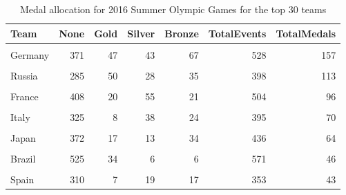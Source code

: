 \documentclass[
]{article}
\begin{document}
\begin{table}[H]
\centering
\caption{\label{tab:SummerBreakDownWinners2}Medal allocation for 2016 Summer Olympic Games for the top 30 teams}
\centering
\fontsize{7}{9}\selectfont
\begin{tabular}[t]{lrrrrrr}
\toprule
Team & None & Gold & Silver & Bronze & TotalEvents & TotalMedals\\
\midrule
\cellcolor{gray!10}{United States} & \cellcolor{gray!10}{443} & \cellcolor{gray!10}{137} & \cellcolor{gray!10}{52} & \cellcolor{gray!10}{67} & \cellcolor{gray!10}{699} & \cellcolor{gray!10}{256}\\
Germany & 371 & 47 & 43 & 67 & 528 & 157\\
\cellcolor{gray!10}{Great Britain} & \cellcolor{gray!10}{325} & \cellcolor{gray!10}{64} & \cellcolor{gray!10}{55} & \cellcolor{gray!10}{26} & \cellcolor{gray!10}{470} & \cellcolor{gray!10}{145}\\
Russia & 285 & 50 & 28 & 35 & 398 & 113\\
\cellcolor{gray!10}{China} & \cellcolor{gray!10}{374} & \cellcolor{gray!10}{44} & \cellcolor{gray!10}{30} & \cellcolor{gray!10}{35} & \cellcolor{gray!10}{483} & \cellcolor{gray!10}{109}\\
\addlinespace
France & 408 & 20 & 55 & 21 & 504 & 96\\
\cellcolor{gray!10}{Australia} & \cellcolor{gray!10}{428} & \cellcolor{gray!10}{23} & \cellcolor{gray!10}{34} & \cellcolor{gray!10}{25} & \cellcolor{gray!10}{510} & \cellcolor{gray!10}{82}\\
Italy & 325 & 8 & 38 & 24 & 395 & 70\\
\cellcolor{gray!10}{Canada} & \cellcolor{gray!10}{328} & \cellcolor{gray!10}{4} & \cellcolor{gray!10}{4} & \cellcolor{gray!10}{61} & \cellcolor{gray!10}{397} & \cellcolor{gray!10}{69}\\
Japan & 372 & 17 & 13 & 34 & 436 & 64\\
\addlinespace
\cellcolor{gray!10}{Serbia} & \cellcolor{gray!10}{73} & \cellcolor{gray!10}{14} & \cellcolor{gray!10}{27} & \cellcolor{gray!10}{13} & \cellcolor{gray!10}{127} & \cellcolor{gray!10}{54}\\
Brazil & 525 & 34 & 6 & 6 & 571 & 46\\
\cellcolor{gray!10}{Netherlands} & \cellcolor{gray!10}{276} & \cellcolor{gray!10}{9} & \cellcolor{gray!10}{25} & \cellcolor{gray!10}{11} & \cellcolor{gray!10}{321} & \cellcolor{gray!10}{45}\\
Spain & 310 & 7 & 19 & 17 & 353 & 43\\

\end{tabular}
\end{table}
\end{document}

